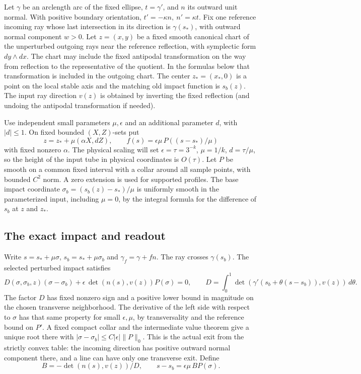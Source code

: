 \documentclass[11pt]{article}
\begin{document}
Let \(\gamma\) be an arclength arc of the fixed ellipse, \(t=\gamma'\), and
\(n\) its outward unit normal. With positive boundary orientation,
\(t'=-\kappa n,\ n'=\kappa t\). Fix one reference incoming ray whose last
intersection in its direction is \(\gamma(s_*)\), with outward normal component
\(w>0\). Let \(z=(x,y)\) be a fixed smooth canonical chart of the unperturbed
outgoing rays near the reference reflection, with symplectic form
\(dy\wedge dx\). The chart may include the fixed antipodal transformation on the
way from reflection to the representative of the quotient. In the formulas below
that transformation is included in the outgoing chart. The center
\(z_*=(x_*,0)\) is a point on the local stable axis and the matching old impact
function is \(s_b(z)\). The input ray direction \(v(z)\) is obtained by
inverting the fixed reflection (and undoing the antipodal transformation if
needed).

Use independent small parameters \(\mu,\epsilon\) and an additional parameter
\(d\), with \(|d|\leq 1\). On fixed bounded \((X,Z)\)-sets put \[
 z=z_*+\mu(\alpha X,dZ),\qquad f(s)=\epsilon\mu\,P((s-s_*)/\mu)
\] with fixed nonzero \(\alpha\). The physical scaling will set
\(\epsilon=\tau=3^{-k}\), \(\mu=1/k\), \(d=\tau/\mu\), so the height of the
input tube in physical coordinates is \(O(\tau)\). Let \(P\) be smooth on a
common fixed interval with a collar around all sample points, with bounded
\(C^2\) norm. A zero extension is used for supported profiles. The base impact
coordinate \(\sigma_b=(s_b(z)-s_*)/\mu\) is uniformly smooth in the
parameterized input, including \(\mu=0\), by the integral formula for the
difference of \(s_b\) at \(z\) and \(z_*\).

\subsection{The exact impact and readout}\label{the-exact-impact-and-readout}

Write \(s=s_*+\mu\sigma\), \(s_b=s_*+\mu\sigma_b\) and \(\gamma_f=\gamma+fn\).
The ray crosses \(\gamma(s_b)\). The selected perturbed impact satisfies \[
 D(\sigma,\sigma_b,z)(\sigma-\sigma_b)
   +\epsilon\,\det(n(s),v(z))P(\sigma)=0,\qquad
 D=\int_0^1\det(\gamma'(s_b+\theta(s-s_b)),v(z))\,d\theta.
\] The factor \(D\) has fixed nonzero sign and a positive lower bound in
magnitude on the chosen transverse neighborhood. The derivative of the left side
with respect to \(\sigma\) has that same property for small \(\epsilon,\mu\), by
transversality and the reference bound on \(P'\). A fixed compact collar and the
intermediate value theorem give a unique root there with
\(|\sigma-\sigma_b|\le C|\epsilon|\|P\|_0\). This is the actual exit from the
strictly convex table: the incoming direction has positive outward normal
component there, and a line can have only one transverse exit. Define \[
 B=-\det(n(s),v(z))/D,\qquad s-s_b=\epsilon\mu\, B P(\sigma).
\]
\end{document}
